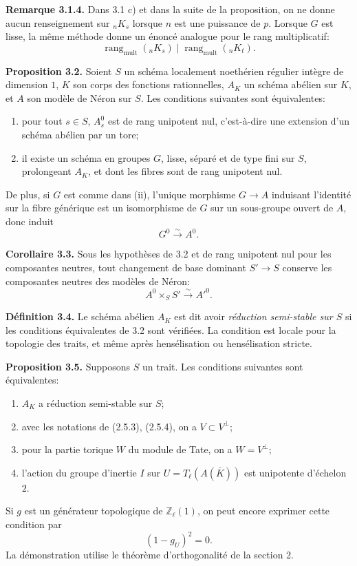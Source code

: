 \documentclass[11pt]{article}
\providecommand{\Z}{\mathbb Z}
\providecommand{\rang}{\operatorname{rang}}
\begin{document}
\textbf{Remarque 3.1.4.} Dans 3.1 c) et dans la suite de la proposition, on ne donne aucun renseignement sur \({}_nK_s\) lorsque \(n\) est une puissance de \(p\).  Lorsque \(G\) est lisse, la même méthode donne un énoncé analogue pour le rang multiplicatif:
\begin{equation}\tag{3.1.4.1}
        \rang_{\mathrm{mult}}({}_nK_s)\mid \rang_{\mathrm{mult}}({}_nK_t).
\end{equation}

\textbf{Proposition 3.2.} Soient \(S\) un schéma localement noethérien régulier intègre de dimension \(1\), \(K\) son corps des fonctions rationnelles, \(A_K\) un schéma abélien sur \(K\), et \(A\) son modèle de Néron sur \(S\).  Les conditions suivantes sont équivalentes:
\begin{enumerate}[label=(\roman*)]
\item pour tout \(s\in S\), \(A_s^0\) est de rang unipotent nul, c'est-à-dire une extension d'un schéma abélien par un tore;
\item il existe un schéma en groupes \(G\), lisse, séparé et de type fini sur \(S\), prolongeant \(A_K\), et dont les fibres sont de rang unipotent nul.
\end{enumerate}
De plus, si \(G\) est comme dans (ii), l'unique morphisme \(G\to A\) induisant l'identité sur la fibre générique est un isomorphisme de \(G\) sur un sous-groupe ouvert de \(A\), donc induit
\[
        G^0\xrightarrow{\sim}A^0.
\]

\textbf{Corollaire 3.3.} Sous les hypothèses de 3.2 et de rang unipotent nul pour les composantes neutres, tout changement de base dominant \(S'\to S\) conserve les composantes neutres des modèles de Néron:
\begin{equation}\tag{3.3.1}
        A^0\times_SS'\xrightarrow{\sim}A'^{0}.
\end{equation}

\textbf{Définition 3.4.} Le schéma abélien \(A_K\) est dit avoir \emph{réduction semi-stable sur \(S\)} si les conditions équivalentes de 3.2 sont vérifiées.  La condition est locale pour la topologie des traits, et même après hensélisation ou hensélisation stricte.

\textbf{Proposition 3.5.} Supposons \(S\) un trait.  Les conditions suivantes sont équivalentes:
\begin{enumerate}[label=(\roman*)]
\item \(A_K\) a réduction semi-stable sur \(S\);
\item avec les notations de (2.5.3), (2.5.4), on a \(V\subset V^\perp\);
\item pour la partie torique \(W\) du module de Tate, on a \(W=V^\perp\);
\item l'action du groupe d'inertie \(I\) sur \(U=T_\ell(A(\bar K))\) est unipotente d'échelon \(2\).
\end{enumerate}
Si \(g\) est un générateur topologique de \(\Z_\ell(1)\), on peut encore exprimer cette condition par
\begin{equation}\tag{3.5.3}
        (1-g_U)^2=0.
\end{equation}
La démonstration utilise le théorème d'orthogonalité de la section 2.
\end{document}
